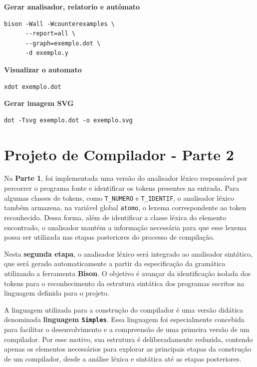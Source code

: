 \documentclass[
  brazilian,
  letterpaper,
]{book}
\theoremstyle{plain}
\theoremstyle{definition}
\theoremstyle{remark}
\begin{document}
\textbf{Gerar analisador, relatorio e autômato}

\begin{verbatim}
bison -Wall -Wcounterexamples \
      --report=all \
      --graph=exemplo.dot \
      -d exemplo.y
\end{verbatim}

\textbf{Visualizar o automato}

\begin{verbatim}
xdot exemplo.dot
\end{verbatim}

\textbf{Gerar imagem SVG}

\begin{verbatim}
dot -Tsvg exemplo.dot -o exemplo.svg
\end{verbatim}

\section{Projeto de Compilador - Parte
2}\label{projeto-de-compilador---parte-2}

Na \textbf{Parte 1}, foi implementada uma versão do analisador léxico
responsável por percorrer o programa fonte e identificar os tokens
presentes na entrada. Para algumas classes de tokens, como
\texttt{T\_NUMERO} e \texttt{T\_IDENTIF}, o analisador léxico também
armazena, na variável global \texttt{atomo}, o lexema correspondente ao
token reconhecido. Dessa forma, além de identificar a classe léxica do
elemento encontrado, o analisador mantém a informação necessária para
que esse lexema possa ser utilizada nas etapas posteriores do processo
de compilação.

Nesta \textbf{segunda etapa}, o analisador léxico será integrado ao
analisador sintático, que será gerado automaticamente a partir da
especificação da gramática utilizando a ferramenta \textbf{Bison}. O
objetivo é avançar da identificação isolada dos tokens para o
reconhecimento da estrutura sintática dos programas escritos na
linguagem definida para o projeto.

A linguagem utilizada para a construção do compilador é uma versão
didática denominada \textbf{linguagem \texttt{Simples}}. Essa linguagem
foi especialmente concebida para facilitar o desenvolvimento e a
compreensão de uma primeira versão de um compilador. Por esse motivo,
sua estrutura é deliberadamente reduzida, contendo apenas os elementos
necessários para explorar as principais etapas da construção de um
compilador, desde a análise léxica e sintática até as etapas
posteriores.
\end{document}
